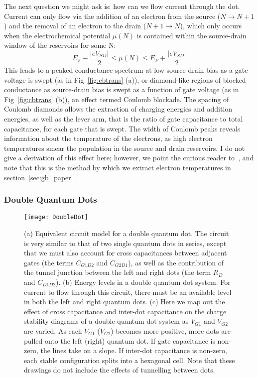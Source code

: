 The next question we might ask is: how can we flow current through the dot. Current can only flow via the addition of an electron
from the source ($N \rightarrow N+1$) and the removal of an electron to the drain ($N+1 \rightarrow N$), which only occurs
when the electrochemical potential $\mu(N)$ is contained within the source-drain window of the reservoirs for some N:
\begin{equation}
  E_F - \frac{|eV_{SD}|}{2} \leq \mu(N) \leq E_F + \frac{|eV_{SD}|}{2}
\end{equation}
This leads to a peaked conductance spectrum at low source-drain bias as a gate voltage is swept (as in Fig~\ref{fig:cbtrans} (a)), or
diamond-like regions of blocked conductance as source-drain bias is swept as a function of gate voltage (as in Fig~\ref{fig:cbtrans} (b)),
an effect termed Coulomb blockade. The spacing of Coulomb diamonds allows the extraction of charging energies and addition energies, as
well as the lever arm, that is the ratio of gate capacitance to total capacitance, for each gate that is swept. The width of Coulomb
peaks reveals information about the temperature of the electrons, as high electron temperatures smear the population in
the source and drain reservoirs. I do not give a derivation of this effect here; however, we point the curious reader to~\cite{grabert2013single},
and note that this is the method by which we extract electron temperatures in section~\ref{sec:gb_paper}.

\subsubsection{Double Quantum Dots}
\begin{figure}
  \texttt{[image: DoubleDot]}
  \caption[Schematic of a Double Quantum Dot]
  {\label{fig:dqd}(a) Equivalent circuit model for a double quantum dot. The circuit is very similar to that of
  two single quantum dots in series, except that we must also account for cross capacitances between adjacent gates
  (the terms $C_{G1D2}$ and $C_{G2D1}$), as well as the contribution of the tunnel junction between the left and
  right dots (the term $R_D$ and $C_{D1D2}$). (b) Energy levels in a double quantum dot system. For current to flow
  through this circuit, there must be an available level in both the left and right quantum dots. (c) Here we map
  out the effect of cross capacitance and inter-dot capacitance on the charge stability diagrams of a double quantum
  dot system as $V_{G1}$ and $V_{G2}$ are varied. As each $V_{G1}$ ($V_{G2}$) becomes more positive, more dots are
  pulled onto the left (right) quantum dot. If gate capacitance is non-zero, the lines take on a slope. If inter-dot
  capacitance is non-zero, each stable configuration splits into a hexagonal cell. Note that these drawings do
  not include the effects of tunnelling between dots.}
\end{figure}

